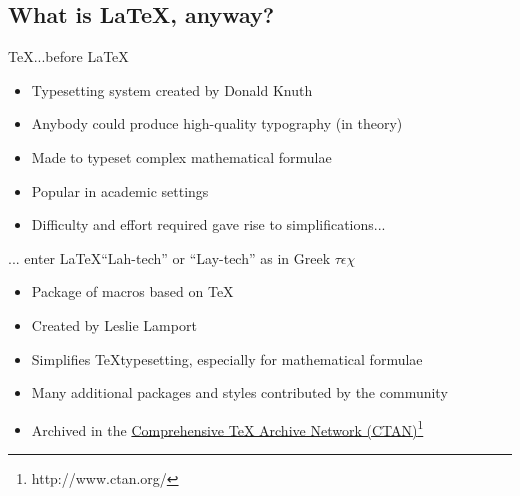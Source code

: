 \documentclass{beamer}
\begin{document}
\subsection{What is \LaTeX, anyway?}
\begin{frame}{\TeX}{...before \LaTeX}
  \begin{itemize}
    \item
      Typesetting system created by Donald Knuth
    \item
      Anybody could produce high-quality typography (in theory)
    \item
      Made to typeset complex mathematical formulae
    \item
      Popular in academic settings
    \item
      Difficulty and effort required gave rise to simplifications...
  \end{itemize}
\end{frame}

\begin{frame}{... enter \LaTeX}{``Lah-tech'' or ``Lay-tech'' as in Greek {$\tau\epsilon\chi$}}

  \begin{itemize}
  \item
    Package of macros based on \TeX
  \item
    Created by Leslie Lamport
  \item
    Simplifies \TeX typesetting, especially for mathematical formulae
  \item
    Many additional packages and styles contributed by the community 
  \item
    Archived in the \hyperref[http://www.ctan.org]{Comprehensive TeX Archive Network (CTAN)}\footnote{http://www.ctan.org/}
  \end{itemize}
\end{frame}
\end{document}
